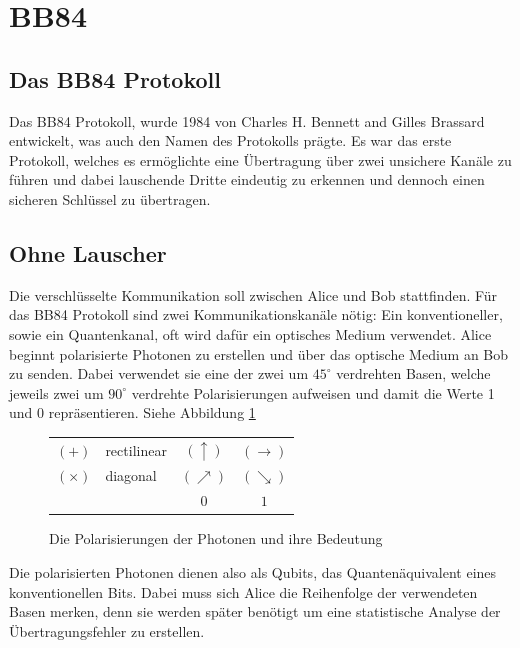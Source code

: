 \section{BB84}
  \subsection{Das BB84 Protokoll}
  Das BB84 Protokoll, wurde 1984 von Charles H. Bennett and Gilles Brassard entwickelt,
  was auch den Namen des Protokolls pr\"agte.
  Es war das erste Protokoll, welches es erm\"oglichte eine \"Ubertragung \"uber zwei unsichere Kan\"ale zu f\"uhren
  und dabei lauschende Dritte eindeutig zu erkennen und dennoch einen sicheren Schl\"ussel zu \"ubertragen.

  \subsection{Ohne Lauscher}
  Die verschl\"usselte Kommunikation soll zwischen Alice und Bob stattfinden.
  F\"ur das BB84 Protokoll sind zwei Kommunikationskan\"ale n\"otig:
  Ein konventioneller, sowie ein Quantenkanal, oft wird daf\"ur ein optisches Medium verwendet.
  Alice beginnt polarisierte Photonen zu erstellen und \"uber das optische Medium an Bob zu senden.
  Dabei verwendet sie eine der zwei um $45^{\circ}$ verdrehten Basen,
  welche jeweils zwei um $90^{\circ}$ verdrehte Polarisierungen aufweisen und damit die Werte 1 und 0 repr\"asentieren. Siehe Abbildung \ref{crypto:poltab}

  \begin{figure}
    \centering
    \begin{tabular}{l l || c c}
      \hline
      $(+)$ & rectilinear & $(\uparrow)$ & $(\rightarrow)$\\
      $(\times)$ & diagonal & $(\nearrow)$ & $(\searrow)$\\
      \hline
      & & $0$ & $1$\\
      \hline
    \end{tabular}
    \caption{Die Polarisierungen der Photonen und ihre Bedeutung\label{crypto:poltab}}
  \end{figure}

  Die polarisierten Photonen dienen also als Qubits, das Quanten\"aquivalent eines konventionellen Bits.
  Dabei muss sich Alice die Reihenfolge der verwendeten Basen merken,
  denn sie werden sp\"ater ben\"otigt um eine statistische Analyse der \"Ubertragungsfehler zu erstellen.

